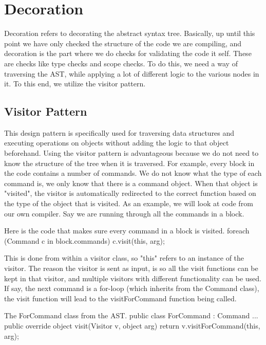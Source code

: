 \section{Decoration}
Decoration refers to decorating the abstract syntax tree. 
Basically, up until this point we have only checked the structure of the code we are compiling, and decoration is the part where we do checks for validating the code it self.
These are checks like type checks and scope checks. \newline
To do this, we need a way of traversing the AST, while applying a lot of different logic to the various nodes in it.
To this end, we utilize the visitor pattern.

\subsection{Visitor Pattern}
\label{visitors}
This design pattern is specifically used for traversing data structures and executing operations on objects without adding the logic to that object beforehand. \newline
Using the visitor pattern is advantageous because we do not need to know the structure of the tree when it is traversed.
For example, every block in the code contains a number of commands. 
We do not know what the type of each command is, we only know that there is a command object. 
When that object is "visited", the visitor is automatically redirected to the correct function based on the type of the object that is visited. \newline
As an example, we will look at code from our own compiler. 
Say we are running through all the commands in a block.
\newline
\begin{source}{Here is the code that makes sure every command in a block is visited.}{}
foreach (Command c in block.commands)
  {
		c.visit(this, arg);
	}
\end{source}

This is done from within a visitor class, so "this" refers to an instance of the visitor. 
The reason the visitor is sent as input, is so all the visit functions can be kept in that visitor, and multiple visitors with different functionality can be used.
If say, the next command is a for-loop (which inherits from the Command class), the visit function will lead to the visitForCommand function being called.

\begin{source}{The ForCommand class from the AST.}{}
public class ForCommand : Command
    {
        ...
        public override object visit(Visitor v, object arg)
        {
            return v.visitForCommand(this, arg);
        }
    }
\end{source}

